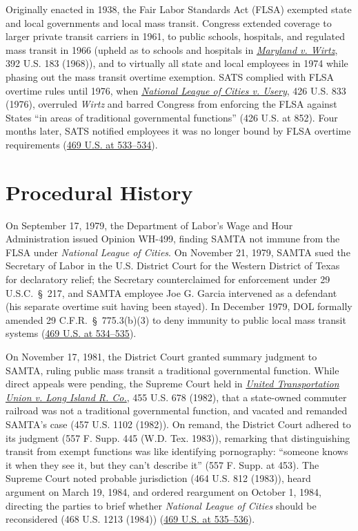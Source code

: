 \documentclass[12pt]{article}
\begin{document}
Originally enacted in 1938, the Fair Labor Standards Act (FLSA) exempted state and local governments and local mass transit. Congress extended coverage to larger private transit carriers in 1961, to public schools, hospitals, and regulated mass transit in 1966 (upheld as to schools and hospitals in \href{https://supreme.justia.com/cases/federal/us/392/183/}{\textit{Maryland v. Wirtz}}, 392 U.S. 183 (1968)), and to virtually all state and local employees in 1974 while phasing out the mass transit overtime exemption. SATS complied with FLSA overtime rules until 1976, when \href{https://supreme.justia.com/cases/federal/us/426/833/}{\textit{National League of Cities v. Usery}}, 426 U.S. 833 (1976), overruled \textit{Wirtz} and barred Congress from enforcing the FLSA against States ``in areas of traditional governmental functions'' (426 U.S. at 852). Four months later, SATS notified employees it was no longer bound by FLSA overtime requirements (\href{https://supreme.justia.com/cases/federal/us/469/528/}{469 U.S. at 533--534}).

\section{Procedural History}
On September 17, 1979, the Department of Labor's Wage and Hour Administration issued Opinion WH-499, finding SAMTA not immune from the FLSA under \textit{National League of Cities}. On November 21, 1979, SAMTA sued the Secretary of Labor in the U.S. District Court for the Western District of Texas for declaratory relief; the Secretary counterclaimed for enforcement under 29 U.S.C.~\S~217, and SAMTA employee Joe G. Garcia intervened as a defendant (his separate overtime suit having been stayed). In December 1979, DOL formally amended 29 C.F.R.~\S~775.3(b)(3) to deny immunity to public local mass transit systems (\href{https://supreme.justia.com/cases/federal/us/469/528/}{469 U.S. at 534--535}).

On November 17, 1981, the District Court granted summary judgment to SAMTA, ruling public mass transit a traditional governmental function. While direct appeals were pending, the Supreme Court held in \href{https://supreme.justia.com/cases/federal/us/455/678/}{\textit{United Transportation Union v. Long Island R. Co.}}, 455 U.S. 678 (1982), that a state-owned commuter railroad was not a traditional governmental function, and vacated and remanded SAMTA's case (457 U.S. 1102 (1982)). On remand, the District Court adhered to its judgment (557 F. Supp. 445 (W.D. Tex. 1983)), remarking that distinguishing transit from exempt functions was like identifying pornography: ``someone knows it when they see it, but they can't describe it'' (557 F. Supp. at 453). The Supreme Court noted probable jurisdiction (464 U.S. 812 (1983)), heard argument on March 19, 1984, and ordered reargument on October 1, 1984, directing the parties to brief whether \textit{National League of Cities} should be reconsidered (468 U.S. 1213 (1984)) (\href{https://supreme.justia.com/cases/federal/us/469/528/}{469 U.S. at 535--536}).
\end{document}
